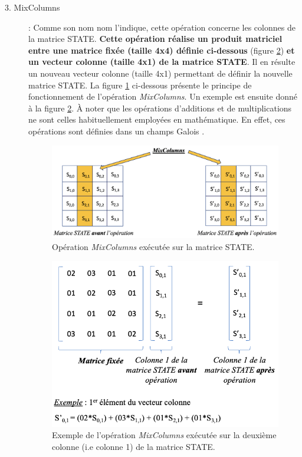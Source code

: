 \documentclass[oneside]{book}
\begin{document}
\begin{description}
\newpage
\item[3. MixColumns] : Comme son nom nom l'indique, cette opération concerne les colonnes de la matrice STATE. \textbf{Cette opération réalise un produit matriciel entre une matrice fixée (taille 4x4) définie ci-dessous} (figure \ref{fig:colonnebis}) \textbf{et un vecteur colonne (taille 4x1) de la matrice STATE}. Il en résulte un nouveau vecteur colonne (taille 4x1) permettant de définir la nouvelle matrice STATE. La figure \ref{fig:colonne} ci-dessous présente le principe de fonctionnement de l'opération \textit{MixColumns}. Un exemple est ensuite donné à la figure \ref{fig:colonnebis}. À noter que les opérations d'additions et de multiplications ne sont celles habituellement employées en mathématique. En effet, ces opérations sont définies dans un champs Galois \cite{noauthor_corps_2019}.


\begin{figure}[htbp]
    \centering
    \includegraphics[scale=0.55]{image/colonne}
    \caption{Opération \textit{MixColumns} exécutée sur la matrice STATE.}
    \label{fig:colonne}
\end{figure}
\begin{figure}[htbp]
    \centering
    \includegraphics[scale=0.42]{image/colonnebis}
    \caption{Exemple de l'opération \textit{MixColumns} exécutée sur la deuxième colonne (i.e colonne 1) de la matrice STATE.}
    \label{fig:colonnebis}
\end{figure}
\vspace{1cm}


\end{description}
\end{document}
